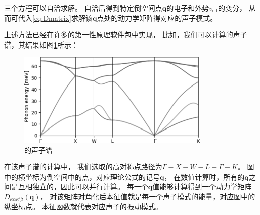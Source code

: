 三个方程可以自洽求解。
自洽后得到特定倒空间点$\bm{q}$的电子和外势$v_\mathrm{eff}$的变分，
从而可代入\ref{eq:Dmatrix}求解该$\bm{q}$点处的动力学矩阵得对应的声子模式。


上述方法已经在许多的第一性原理软件包中实现，
比如，我们可以计算的声子谱，其结果如图\ref{fig:pd}所示：

\begin{figure}[H]
  \includegraphics[width=0.82\textwidth]{figs/gray-pd.png}
  \centering
  \caption{的声子谱}
  \label{fig:pd}
\end{figure}

在该声子谱的计算中，
我们选取的高对称点路径为$\Gamma-X-W-L-\Gamma-K$。
图中的横坐标为倒空间中的点，对应理论公式的记号$\bm{q}$，
在数值计算时，所有的$\bm{q}$之间是互相独立的，因此可以并行计算。
每一个$\bm{q}$值能够计算得到一个动力学矩阵$D_{\kappa\alpha\kappa'\beta}(\bm{q})$，
对该矩阵对角化后本征值就是每一个声子模式的能量，对应图中的纵坐标点。
本征函数就代表对应声子的振动模式。

